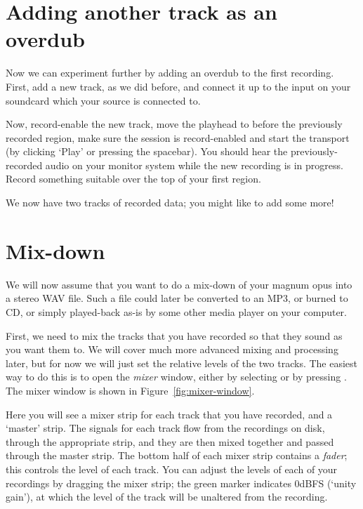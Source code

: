 \documentclass[10pt,a4paper]{book}
\newcommand{\menu}[1]{\emph{\StrSubstitute{#1}{,}{ $\rightarrow$ }}}
\newcommand{\key}[1]{\emph{\StrSubstitute{#1}{,}{ + }}}
\newcommand{\screenshot}[3]{%
\begin{figure}[ht]%
\begin{center}
\texttt{[image: screenshots/\#1]}
\end{center}
\caption{#2}
\label{#3}
\end{figure}}
\begin{document}
\section{Adding another track as an overdub}

Now we can experiment further by adding an overdub to the first
recording.  First, add a new track, as we did before, and connect it
up to the input on your soundcard which your source is connected to.

Now, record-enable the new track, move the playhead to before the
previously recorded region, make sure the session is record-enabled
and start the transport (by clicking `Play' or pressing the spacebar).
You should hear the previously-recorded audio on your monitor system
while the new recording is in progress.  Record something suitable
over the top of your first region.

We now have two tracks of recorded data; you might like to add some
more!

\section{Mix-down}

We will now assume that you want to do a mix-down of your magnum opus
into a stereo WAV file.  Such a file could later be converted to an
MP3, or burned to CD, or simply played-back as-is by some other media
player on your computer.  

First, we need to mix the tracks that you have recorded so that they
sound as you want them to.  We will cover much more advanced mixing
and processing later, but for now we will just set the relative levels
of the two tracks.  The easiest way to do this is to open the
\emph{mixer} window, either by selecting \menu{Window,Mixer} or by
pressing \key{Alt,M}.  The mixer window is shown in Figure~\ref{fig:mixer-window}.


Here you will see a mixer strip for each track that you have recorded,
and a `master' strip.  The signals for each track flow from the
recordings on disk, through the appropriate strip, and they are then
mixed together and passed through the master strip.  The bottom half
of each mixer strip contains a \emph{fader}; this controls the level
of each track.  You can adjust the levels of each of your recordings
by dragging the mixer strip; the green marker indicates 0dBFS (`unity
gain'), at which the level of the track will be unaltered from the
recording.
\end{document}
